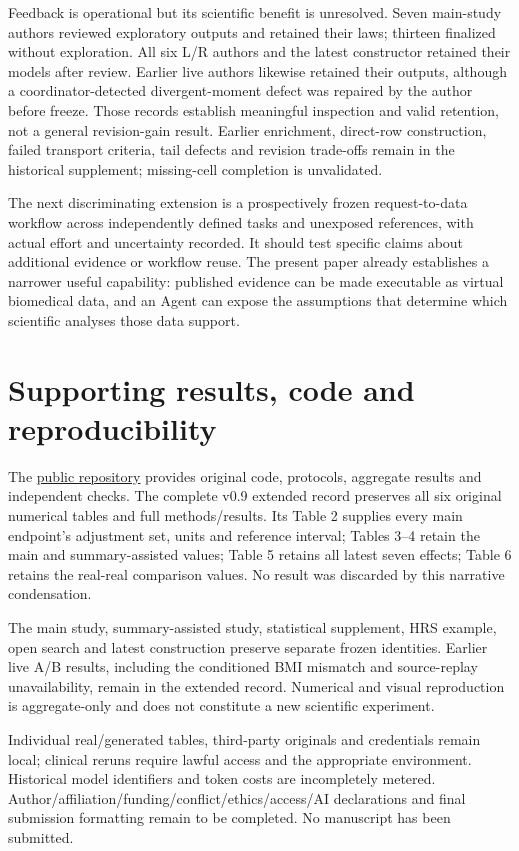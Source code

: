 \documentclass[10pt,twocolumn]{article}
\begin{document}
Feedback is operational but its scientific benefit is unresolved. Seven main-study authors reviewed exploratory outputs and retained their laws; thirteen finalized without exploration. All six L/R authors and the latest constructor retained their models after review. Earlier live authors likewise retained their outputs, although a coordinator-detected divergent-moment defect was repaired by the author before freeze. Those records establish meaningful inspection and valid retention, not a general revision-gain result. Earlier enrichment, direct-row construction, failed transport criteria, tail defects and revision trade-offs remain in the historical supplement; missing-cell completion is unvalidated.


The next discriminating extension is a prospectively frozen request-to-data workflow across independently defined tasks and unexposed references, with actual effort and uncertainty recorded. It should test specific claims about additional evidence or workflow reuse. The present paper already establishes a narrower useful capability: published evidence can be made executable as virtual biomedical data, and an Agent can expose the assumptions that determine which scientific analyses those data support.


\section{Supporting results, code and reproducibility}

The \href{https://github.com/ziwang11112/evidence-guided-virtual-cohorts-2026}{public repository} provides original code, protocols, aggregate results and independent checks. The complete v0.9 extended record preserves all six original numerical tables and full methods/results. Its Table 2 supplies every main endpoint's adjustment set, units and reference interval; Tables 3–4 retain the main and summary-assisted values; Table 5 retains all latest seven effects; Table 6 retains the real-real comparison values. No result was discarded by this narrative condensation.


The main study, summary-assisted study, statistical supplement, HRS example, open search and latest construction preserve separate frozen identities. Earlier live A/B results, including the conditioned BMI mismatch and source-replay unavailability, remain in the extended record. Numerical and visual reproduction is aggregate-only and does not constitute a new scientific experiment.


Individual real/generated tables, third-party originals and credentials remain local; clinical reruns require lawful access and the appropriate environment. Historical model identifiers and token costs are incompletely metered. Author/affiliation/funding/conflict/ethics/access/AI declarations and final submission formatting remain to be completed. No manuscript has been submitted.
\end{document}

